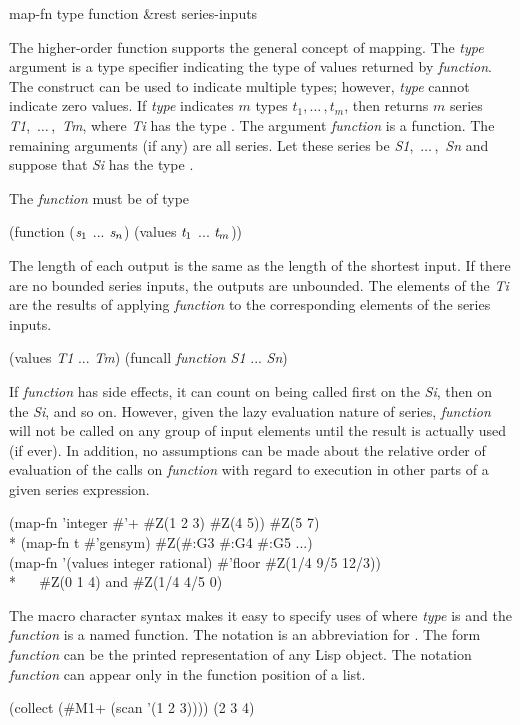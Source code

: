 \begin{defun}[Function]
map-fn type function &rest series-inputs

The higher-order function  supports the general concept of
mapping.   The \emph{type} argument is a type specifier indicating
the type of values returned by \emph{function}.  The 
construct can be used to indicate multiple types; however, \emph{type}
cannot indicate zero values.  If \emph{type} indicates $m$ types
$t_1, \ldots\,, t_m$,
then  returns $m$ series
\emph{T1},~$\ldots\,$,~\emph{Tm}, where \emph{Ti} has the
type .
The argument
\emph{function} is a function.   The remaining arguments (if any) are all
series.  Let these series be \emph{S1},~$\ldots\,$,~\emph{Sn} and suppose that
\emph{Si} has the type .

The \emph{function} must be of type
\begin{lisp}
(function ($\emph{s}_1$ ... $\emph{s}_{n}$) (values $\emph{t}_1$ ... $\emph{t}_{m}$))
\end{lisp}

The length of each output is the same as the length of the shortest input.
If there are no bounded series inputs, the outputs are unbounded.
The elements of the \emph{Ti} are the results of applying \emph{function} to
the corresponding elements of the series inputs.
\begin{lisp}
(values \emph{T1} ... \emph{Tm}) {\EQ} (funcall \emph{function} \emph{S1} ... \emph{Sn})
\end{lisp}

If \emph{function} has side effects, it can count on being called first on
the \emph{Si}, then on the \emph{Si}, and so on.  However, given
the lazy evaluation nature of series, \emph{function} will not be called on
any group of input elements until the result is actually used (if ever).
In addition, no assumptions can be made about the relative order of
evaluation of the calls on \emph{function} with regard to execution in other parts of a
given series expression.
\begin{lisp}
(map-fn 'integer \#'+ \#Z(1 2 3) \#Z(4 5)) {\EV} \#Z(5 7) \\*
(map-fn t \#'gensym) {\EV} \#Z(\#:G3 \#:G4 \#:G5 ...) \\
(map-fn '(values integer rational) \#'floor \#Z(1/4 9/5 12/3)) \\*
~~{\EV} \#Z(0 1 4) {\rm and} \#Z(1/4 4/5 0)
\end{lisp}

The \cd{\#} macro character syntax  makes it easy to specify uses of 
where \emph{type} is  and the \emph{function} is a named
function.  The notation  is an
abbreviation for .  The form \emph{function} can
be the printed representation of any Lisp object.  The notation
\emph{function} can appear only in the
function position of a list.
\begin{lisp}
(collect (\#M1+ (scan '(1 2 3)))) {\EV} (2 3 4)
\end{lisp}
\end{defun}

